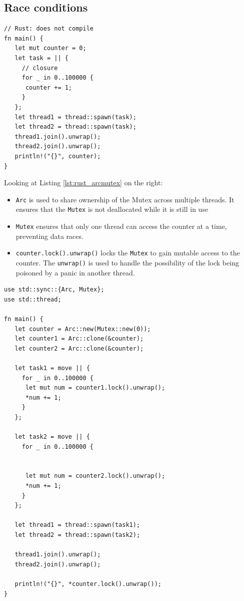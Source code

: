 \subsection{Race conditions}
\begin{paracol}{2}
   \colfill
\begin{lstlisting}[caption={Broken Rust code},label={lst:rust_broken}]
// Rust: does not compile
fn main() {
   let mut counter = 0;
   let task = || {
     // closure
     for _ in 0..100000 {
      counter += 1;
     }
   };
   let thread1 = thread::spawn(task);
   let thread2 = thread::spawn(task);
   thread1.join().unwrap();
   thread2.join().unwrap();
   println!("{}", counter);
}   
\end{lstlisting}

Looking at Listing \ref{lst:rust_arcmutex} on the right:\ns
\begin{itemize}
   \item \lstinline|Arc| is used to share ownership of the Mutex across multiple threads. It ensures that the \lstinline|Mutex| is not deallocated while it is still in use
   
   \item \lstinline|Mutex| ensures that only one thread can access the counter at a time, preventing data races.
   
   \item \lstinline|counter.lock().unwrap()| locks the \lstinline|Mutex| to gain mutable access to the counter. The \lstinline|unwrap()| is used to handle the possibility of the lock being poisoned by a panic in another thread.
\end{itemize}
   \colfill
   \switchcolumn

\begin{lstlisting}[caption={Fixed code with \lstinline|Arc<Mutex<T>>| and \lstinline|move|, but some code duplication is present},label={lst:rust_arcmutex}]
use std::sync::{Arc, Mutex};
use std::thread;

fn main() {
   let counter = Arc::new(Mutex::new(0));
   let counter1 = Arc::clone(&counter);
   let counter2 = Arc::clone(&counter);

   let task1 = move || {
     for _ in 0..100000 {
      let mut num = counter1.lock().unwrap();
      *num += 1;
     }
   };

   let task2 = move || {
     for _ in 0..100000 {
      

      let mut num = counter2.lock().unwrap();
      *num += 1;
     }
   };

   let thread1 = thread::spawn(task1);
   let thread2 = thread::spawn(task2);

   thread1.join().unwrap();
   thread2.join().unwrap();

   println!("{}", *counter.lock().unwrap());
}   
\end{lstlisting}

\end{paracol}

